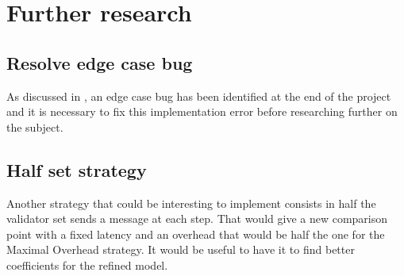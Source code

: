 \begin{table}[h]
\end{table}

\FloatBarrier
\section{Further research}
\subsection{Resolve edge case bug}
As discussed in , an edge case bug has been identified at
the end of the project and it is necessary to fix this implementation error
before researching further on the subject.

\subsection{Half set strategy}
Another strategy that could be interesting to implement consists in 
half the validator set sends a message at each step. That would give a new
comparison point with a fixed latency and an overhead that would be half the one
for the Maximal Overhead strategy. It would be useful to have it to find better
coefficients for the refined model.

